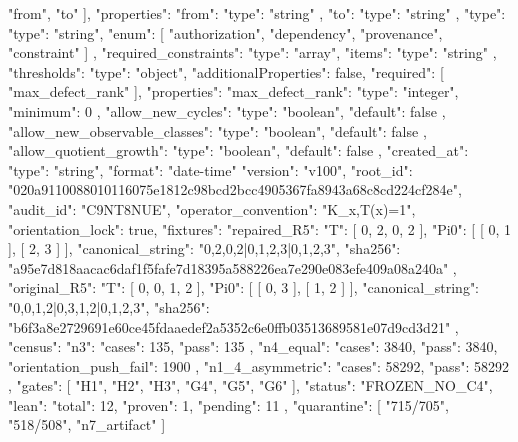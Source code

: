 {{{{{{              "from",
              "to"
            ],
            "properties": {
              "from": {
                "type": "string"
              },
              "to": {
                "type": "string"
              },
              "type": {
                "type": "string",
                "enum": [
                  "authorization",
                  "dependency",
                  "provenance",
                  "constraint"
                ]
              }
            }
          }
        },
        "required_constraints": {
          "type": "array",
          "items": {
            "type": "string"
          }
        }
      }
    },
    "thresholds": {
      "type": "object",
      "additionalProperties": false,
      "required": [
        "max_defect_rank"
      ],
      "properties": {
        "max_defect_rank": {
          "type": "integer",
          "minimum": 0
        },
        "allow_new_cycles": {
          "type": "boolean",
          "default": false
        },
        "allow_new_observable_classes": {
          "type": "boolean",
          "default": false
        },
        "allow_quotient_growth": {
          "type": "boolean",
          "default": false
        }
      }
    },
    "created_at": {
      "type": "string",
      "format": "date-time"
    }
  }
}
{
  "version": "v100",
  "root_id": "020a9110088010116075e1812c98bcd2bcc4905367fa8943a68c8cd224cf284e",
  "audit_id": "C9NT8NUE",
  "operator_convention": "K_x,T(x)=1",
  "orientation_lock": true,
  "fixtures": {
    "repaired_R5": {
      "T": [
        0,
        2,
        0,
        2
      ],
      "Pi0": [
        [
          0,
          1
        ],
        [
          2,
          3
        ]
      ],
      "canonical_string": "0,2,0,2|{{0,1},{2,3}}|{{0,1},{2,3}}",
      "sha256": "a95e7d818aacac6daf1f5fafe7d18395a588226ea7e290e083efe409a08a240a"
    },
    "original_R5": {
      "T": [
        0,
        0,
        1,
        2
      ],
      "Pi0": [
        [
          0,
          3
        ],
        [
          1,
          2
        ]
      ],
      "canonical_string": "0,0,1,2|{{0,3},{1,2}}|{{0,1},{2,3}}",
      "sha256": "b6f3a8e2729691e60ce45fdaaedef2a5352c6e0ffb03513689581e07d9cd3d21"
    }
  },
  "census": {
    "n3": {
      "cases": 135,
      "pass": 135
    },
    "n4_equal": {
      "cases": 3840,
      "pass": 3840,
      "orientation_push_fail": 1900
    },
    "n1_4_asymmetric": {
      "cases": 58292,
      "pass": 58292
    }
  },
  "gates": [
    "H1",
    "H2",
    "H3",
    "G4",
    "G5",
    "G6"
  ],
  "status": "FROZEN_NO_C4",
  "lean": {
    "total": 12,
    "proven": 1,
    "pending": 11
  },
  "quarantine": [
    "715/705",
    "518/508",
    "n7_artifact"
  ]
}
